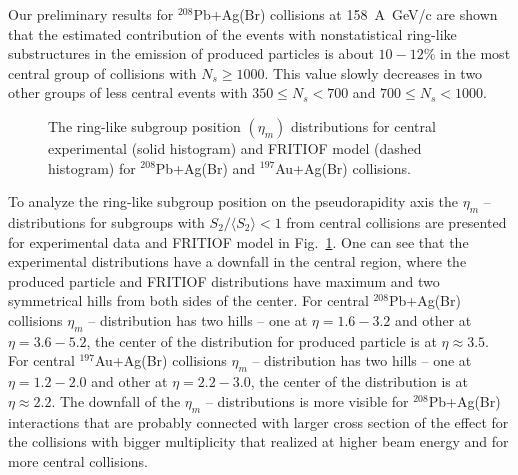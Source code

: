 \documentclass[12pt]{article}
\newcommand{\SDVA}{\langle S_2 \rangle}
\begin{document}
Our preliminary results for ${}^{208}$Pb+Ag(Br) collisions at 158~A~GeV/c are shown that the estimated contribution of the events with  nonstatistical ring-like substructures in the emission of produced particles is about $10 - 12 \%$ in the most central group of collisions with $N_s \geq 1000$. This value slowly decreases in two other groups of less central events with $350 \leq N_s < 700$ and $700 \leq N_s < 1000$.\\

\begin{figure}[!t]
\epsfysize=7cm
\begin{center}
\end{center}
\caption[*]{ The ring-like subgroup position $(\eta_m)$ distributions for central experimental (solid histogram) and FRITIOF model (dashed histogram) for ${}^{208}$Pb+Ag(Br) and ${}^{197}$Au+Ag(Br) collisions. }
\label{fig07}
\end{figure}

To analyze the ring-like subgroup position on the pseudorapidity axis the $\eta_m$ -- distributions for subgroups with $S_2/\SDVA < 1$ from central collisions are presented for experimental data and FRITIOF model in Fig.~\ref{fig07}. 
One can see that the experimental distributions have a downfall in the central region, where the produced particle and FRITIOF distributions have maximum and two symmetrical hills from both sides of the center. For central ${}^{208}$Pb+Ag(Br) collisions $\eta_m$ -- distribution has two hills  -- one at $\eta = 1.6 - 3.2$ and other at $\eta = 3.6 - 5.2$, the center of the distribution for produced particle is at $\eta \approx 3.5$. For central ${}^{197}$Au+Ag(Br) collisions $\eta_m$ -- distribution has two hills -- one at $\eta = 1.2 - 2.0$ and other at $\eta = 2.2 - 3.0$, the center of the distribution is at $\eta \approx 2.2$. The downfall of the $\eta_m$ -- distributions is more visible for ${}^{208}$Pb+Ag(Br) interactions that are probably connected with larger cross section of the effect for the collisions with bigger multiplicity that realized at higher beam energy and for more central collisions.\\
\end{document}
